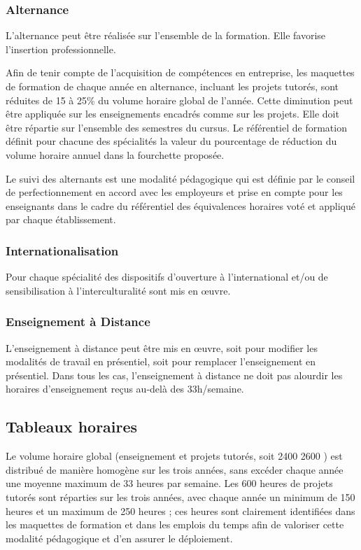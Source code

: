 \documentclass[10pt]{article}
\begin{document}
\subsubsection{Alternance}
L’alternance peut être réalisée sur l’ensemble de la formation. Elle
favorise l’insertion professionnelle.

Afin de tenir compte de l’acquisition de compétences en entreprise, les
maquettes de formation de chaque année en alternance, incluant les
projets tutorés, sont réduites de 15 à 25\% du volume
horaire global de l’année. Cette diminution peut être appliquée sur les
enseignements encadrés comme sur les projets. Elle doit être répartie
sur l’ensemble des semestres du cursus.  Le référentiel de formation
définit pour chacune des spécialités la valeur du pourcentage de
réduction du volume horaire annuel dans la fourchette proposée.

Le suivi des alternants est une modalité pédagogique qui est définie par
le conseil de perfectionnement en accord avec les employeurs et prise en
compte pour les enseignants dans le cadre du référentiel des
équivalences horaires voté et appliqué par chaque établissement.
\subsubsection{Internationalisation}

Pour chaque spécialité des dispositifs d’ouverture à l’international
et/ou de sensibilisation à l’interculturalité sont mis en œuvre.

\subsubsection{Enseignement à Distance}
L’enseignement à distance peut être mis en œuvre, soit pour modifier les
modalités de travail en présentiel, soit pour remplacer l’enseignement
en présentiel. Dans tous les cas, l’enseignement à distance ne doit pas
alourdir les horaires d’enseignement reçus au-delà des 33h/semaine.

\subsection{Tableaux horaires}
\selectallparcours
Le volume horaire global (enseignement et projets tutorés, soit
2400
2600
\unskip) est distribué de manière homogène sur
les trois années, sans excéder chaque année une moyenne maximum de 33 heures par semaine.
Les 600 heures de projets tutorés sont réparties sur les trois années, avec chaque année un
minimum de 150 heures et un maximum de 250 heures ; ces heures sont clairement identifiées
dans les maquettes de formation et dans les emplois du temps afin de valoriser cette modalité
pédagogique et d’en assurer le déploiement.
\end{document}
